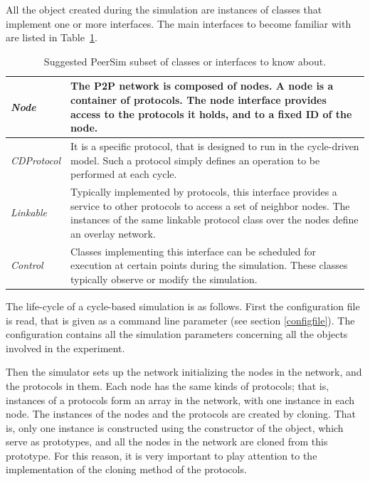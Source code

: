 \documentclass[a4paper,11pt]{article}
\begin{document}
All the object created during the simulation are instances of classes
that implement one or more interfaces. The
main interfaces to become familiar with are listed in
Table~\ref{t:psim_classes}.


\label{table1}
\begin{table}
\begin{center}\begin{tabular}{|l|p{11cm}|}
\hline 
\emph{Node}&
The P2P network is composed of nodes. A node is a container of
protocols. The node interface provides access to the protocols
it holds, and to a fixed ID of the node.\\
\hline 
\emph{CDProtocol}&
It is a specific protocol, that is designed to run in the cycle-driven
model. Such a protocol simply defines an operation to be performed at
each cycle.\\
\hline 
\emph{Linkable}&
Typically implemented by protocols, this interface provides a service
to other protocols to access a set of neighbor nodes.
The instances of the same linkable protocol class over the nodes define
an overlay network.\\
\hline 
\emph{Control}&
Classes implementing this interface can be scheduled for execution at
certain points during the simulation.
These classes typically observe or
modify the simulation.\\
\hline
\end{tabular}\end{center}

\caption{\label{t:psim_classes}Suggested PeerSim subset of classes or
  interfaces to know about.} 
\end{table}


The life-cycle of a cycle-based simulation is as follows.
First the configuration file is read, that is given as a command line
parameter (see section 
\ref{configfile}).
The configuration contains all the simulation parameters 
concerning all the
objects involved in the experiment.

Then the simulator sets up the network initializing the nodes in the
network, and the protocols in them.
Each node has the same kinds of protocols; that is, instances of
a protocols form an array in the network, with one instance in each
node.
The instances of the nodes and the protocols are created by cloning.
That is, only one instance is constructed using the constructor of the
object, which serve as prototypes, and all the nodes in the network are
cloned from this prototype.
For this reason, it is very important to play attention to the implementation
of the cloning method of the protocols.
\end{document}
